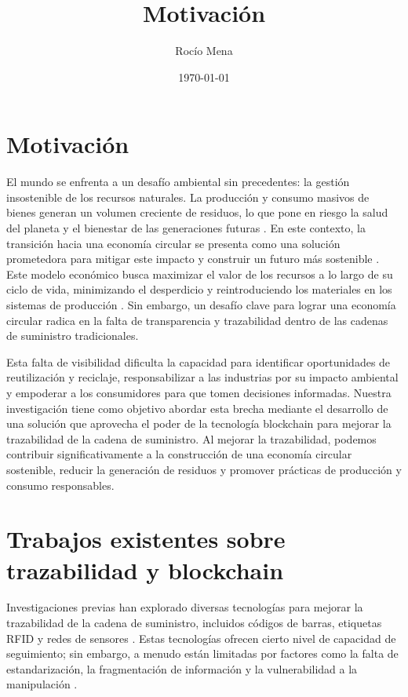 \documentclass[main.tex]{subfiles}
\title{Motivación}
\author{Rocío Mena}
\date{\today}
\begin{document}
\maketitle

\section{Motivación}

El mundo se enfrenta a un desafío ambiental sin precedentes: la gestión insostenible de los recursos naturales. La producción y consumo masivos de bienes generan un volumen creciente de residuos, lo que pone en riesgo la salud del planeta y el bienestar de las generaciones futuras \cite{IPCC2022, pelegri2021ipcc}. En este contexto, la transición hacia una economía circular se presenta como una solución prometedora para mitigar este impacto y construir un futuro más sostenible \cite{clima2022book}. Este modelo económico busca maximizar el valor de los recursos a lo largo de su ciclo de vida, minimizando el desperdicio y reintroduciendo los materiales en los sistemas de producción \cite{da2022economia, melendez2021economia}. Sin embargo, un desafío clave para lograr una economía circular radica en la falta de transparencia y trazabilidad dentro de las cadenas de suministro tradicionales.

Esta falta de visibilidad dificulta la capacidad para identificar oportunidades de reutilización y reciclaje, responsabilizar a las industrias por su impacto ambiental y empoderar a los consumidores para que tomen decisiones informadas. Nuestra investigación tiene como objetivo abordar esta brecha mediante el desarrollo de una solución que aprovecha el poder de la tecnología blockchain para mejorar la trazabilidad de la cadena de suministro. Al mejorar la trazabilidad, podemos contribuir significativamente a la construcción de una economía circular sostenible, reducir la generación de residuos y promover prácticas de producción y consumo responsables.

\section{Trabajos existentes sobre trazabilidad y blockchain}

Investigaciones previas han explorado diversas tecnologías para mejorar la trazabilidad de la cadena de suministro, incluidos códigos de barras, etiquetas RFID y redes de sensores \cite{pending}. Estas tecnologías ofrecen cierto nivel de capacidad de seguimiento; sin embargo, a menudo están limitadas por factores como la falta de estandarización, la fragmentación de información y la vulnerabilidad a la manipulación \cite{pending}.
\end{document}
